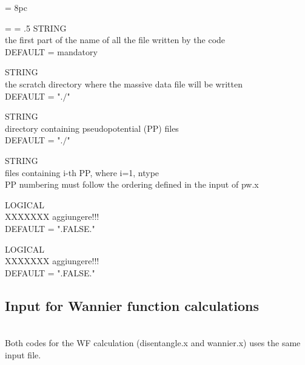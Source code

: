 \newdimen\descindent \descindent = 8pc
{\noindent \leftskip = \descindent \parskip = .5\baselineskip
{}%
STRING \\ the first part of the name of all the file written by
the code\\ DEFAULT = mandatory \par
\noindent{}%
STRING \\ the scratch directory where the massive data file will
be written\\ DEFAULT = "$./$" \par
\noindent{}%
STRING \\directory containing pseudopotential (PP) files\\
DEFAULT = "$./$" \par
\noindent{}%
STRING \\ files containing i-th PP, where i=1, ntype \\ PP
numbering must follow the ordering defined in the input of pw.x
\par
\noindent{}%
LOGICAL \\ XXXXXXX aggiungere!!!\\ DEFAULT = ".FALSE." \par
\noindent{}%
LOGICAL \\ XXXXXXX aggiungere!!!\\ DEFAULT = ".FALSE." \par}\bigskip

\subsection{Input for Wannier function calculations}
\\
\noindent Both codes for the WF calculation (disentangle.x and wannier.x) uses
the same input file.\\

